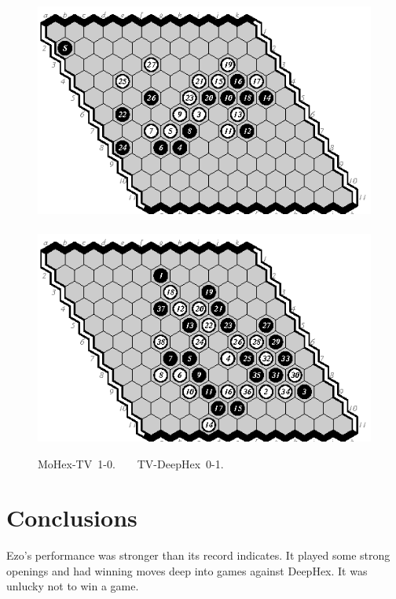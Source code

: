 \documentclass{icga}
\def\Dx{\mbox{\sc DeepHex}}
\def\Eo{\mbox{\sc Ezo}}
\def\Mx{\mbox{\sc MoHex}}
\def\TV{\mbox{\sc TV}} %
\begin{document}

\begin{figure}[hbp]
\includegraphics[scale=1.3]{m-tony.swap.eps}\hspace*{-2cm}\
\includegraphics[scale=1.3]{tony-d.eps}
\caption{\Mx-\TV\ 1-0. ~ ~ \TV-\Dx\ 0-1.}
\end{figure}

\section{Conclusions}
\Eo{}'s performance was stronger than its record indicates. 
It played some strong openings and had winning moves deep
into games against \Dx.
It was unlucky not to win a game.
\end{document}
